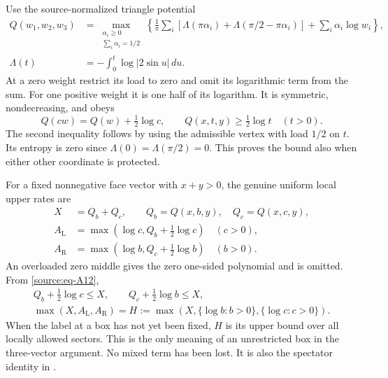 \documentclass[11pt]{article}
\numberwithin{equation}{section}
\begin{document}
Use the source-normalized triangle potential \begin{equation}\label{source:eq-A11}
\begin{aligned}
Q(w_1,w_2,w_3)&=
 \max_{\substack{\alpha_i\ge0\\\sum_i\alpha_i=1/2}}
 \left\{\frac1\pi\sum_i
 [\Lambda(\pi\alpha_i)+\Lambda(\pi/2-\pi\alpha_i)]
       +\sum_i\alpha_i\log w_i\right\},\\
 \Lambda(t)&=-\int_0^t\log|2\sin u|\,du.
\end{aligned}
\end{equation} At a zero weight restrict its load to zero and omit its
logarithmic term from the sum. For one positive weight
it is one half of its logarithm. It is symmetric, nondecreasing, and
obeys \begin{equation}\label{source:eq-A12}
Q(cw)=Q(w)+\tfrac12\log c,
 \qquad Q(x,t,y)\ge\tfrac12\log t\quad(t>0).
\end{equation} The second inequality follows by using the admissible vertex with
load \(1/2\) on \(t\). Its entropy is zero since
\(\Lambda(0)=\Lambda(\pi/2)=0\). This proves the bound also when either
other coordinate is protected.

For a fixed nonnegative face vector with \(x+y>0\), the genuine uniform
local upper rates are \begin{equation}\label{source:eq-A13}
\begin{split}
 X&=Q_b+Q_c,\qquad Q_b=Q(x,b,y),\quad Q_c=Q(x,c,y),\\
 A_{\mathrm L}&=\max(\log c,Q_b+\tfrac12\log c)\quad(c>0),\\
 A_{\mathrm R}&=\max(\log b,Q_c+\tfrac12\log b)\quad(b>0).
\end{split}
\end{equation} An overloaded zero middle gives the zero one-sided polynomial and is
omitted. From \eqref{source:eq-A12}, \begin{equation}\label{source:eq-A14}
\begin{gathered}
 Q_b+\tfrac12\log c\le X,\qquad
 Q_c+\tfrac12\log b\le X,\\
 \max(X,A_{\mathrm L},A_{\mathrm R})
     =H:=\max(X,\{\log b:b>0\},\{\log c:c>0\}).
\end{gathered}
\end{equation} When the label at a box has not yet been fixed, $H$ is its upper
bound over all locally allowed sectors. This is the only meaning of
an unrestricted box in the three-vector argument. No mixed term has been
lost. It is also the spectator identity in
\cite[equation (1.4)]{CasimirSources}.
\end{document}
